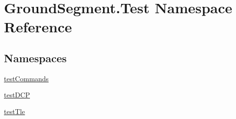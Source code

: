 \hypertarget{namespace_ground_segment_1_1_test}{}\section{Ground\+Segment.\+Test Namespace Reference}
\label{namespace_ground_segment_1_1_test}
\subsection*{Namespaces}
\begin{DoxyCompactItemize}
\item 
 \hyperlink{namespace_ground_segment_1_1_test_1_1test_commands}{test\+Commands}
\item 
 \hyperlink{namespace_ground_segment_1_1_test_1_1test_d_c_p}{test\+D\+C\+P}
\item 
 \hyperlink{namespace_ground_segment_1_1_test_1_1test_tle}{test\+Tle}
\end{DoxyCompactItemize}

